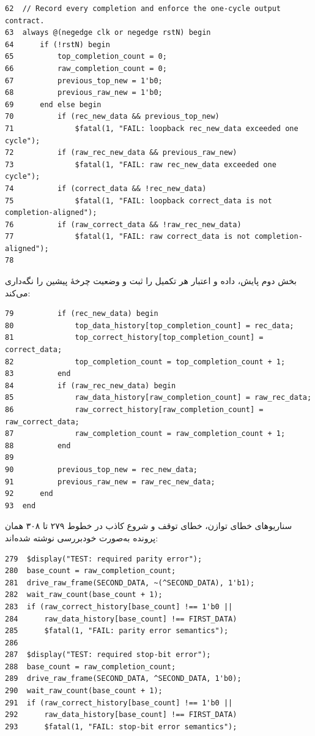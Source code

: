 \begin{dsdlcodeblock}
\begin{verbatim}
62  // Record every completion and enforce the one-cycle output contract.
63  always @(negedge clk or negedge rstN) begin
64      if (!rstN) begin
65          top_completion_count = 0;
66          raw_completion_count = 0;
67          previous_top_new = 1'b0;
68          previous_raw_new = 1'b0;
69      end else begin
70          if (rec_new_data && previous_top_new)
71              $fatal(1, "FAIL: loopback rec_new_data exceeded one cycle");
72          if (raw_rec_new_data && previous_raw_new)
73              $fatal(1, "FAIL: raw rec_new_data exceeded one cycle");
74          if (correct_data && !rec_new_data)
75              $fatal(1, "FAIL: loopback correct_data is not completion-aligned");
76          if (raw_correct_data && !raw_rec_new_data)
77              $fatal(1, "FAIL: raw correct_data is not completion-aligned");
78
\end{verbatim}
\end{dsdlcodeblock}

بخش دوم پایش، داده و اعتبار هر تکمیل را ثبت و وضعیت چرخهٔ پیشین را نگه‌داری می‌کند:

\begin{dsdlcodeblock}
\begin{verbatim}
79          if (rec_new_data) begin
80              top_data_history[top_completion_count] = rec_data;
81              top_correct_history[top_completion_count] = correct_data;
82              top_completion_count = top_completion_count + 1;
83          end
84          if (raw_rec_new_data) begin
85              raw_data_history[raw_completion_count] = raw_rec_data;
86              raw_correct_history[raw_completion_count] = raw_correct_data;
87              raw_completion_count = raw_completion_count + 1;
88          end
89
90          previous_top_new = rec_new_data;
91          previous_raw_new = raw_rec_new_data;
92      end
93  end
\end{verbatim}
\end{dsdlcodeblock}

سناریوهای خطای توازن، خطای توقف و شروع کاذب در خطوط ۲۷۹ تا ۳۰۸ همان پرونده به‌صورت
خودبررسی نوشته شده‌اند:

\begin{dsdlcodeblock}
\begin{verbatim}
279  $display("TEST: required parity error");
280  base_count = raw_completion_count;
281  drive_raw_frame(SECOND_DATA, ~(^SECOND_DATA), 1'b1);
282  wait_raw_count(base_count + 1);
283  if (raw_correct_history[base_count] !== 1'b0 ||
284      raw_data_history[base_count] !== FIRST_DATA)
285      $fatal(1, "FAIL: parity error semantics");
286
287  $display("TEST: required stop-bit error");
288  base_count = raw_completion_count;
289  drive_raw_frame(SECOND_DATA, ^SECOND_DATA, 1'b0);
290  wait_raw_count(base_count + 1);
291  if (raw_correct_history[base_count] !== 1'b0 ||
292      raw_data_history[base_count] !== FIRST_DATA)
293      $fatal(1, "FAIL: stop-bit error semantics");
\end{verbatim}
\end{dsdlcodeblock}

